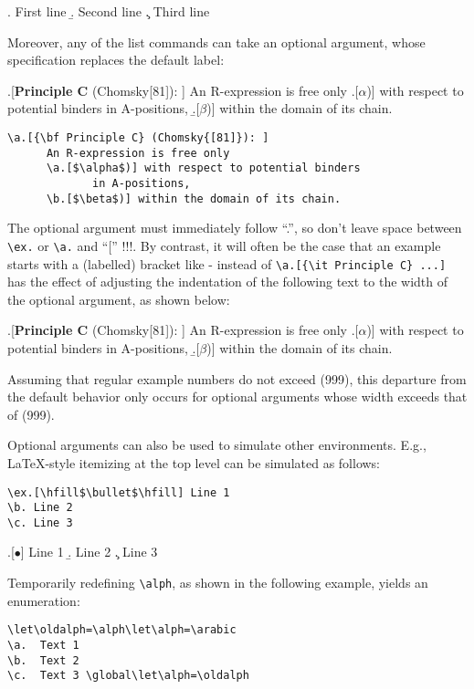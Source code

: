 \documentclass{article}
\begin{document}
\a. First line
\b. Second line
\c. Third line

Moreover, any of the list commands can take an optional 
argument, whose specification replaces the default label: 
 
\begin{samepage}
\a.[{\bf Principle C} (Chomsky{[81]}): ] An R-expression is free only
      \a.[$\alpha$)] with respect to potential binders
             in A-positions,
      \b.[$\beta$)] within the domain of its chain.
      
\begin{verbatim}
\a.[{\bf Principle C} (Chomsky{[81]}): ] 
      An R-expression is free only
      \a.[$\alpha$)] with respect to potential binders
             in A-positions,
      \b.[$\beta$)] within the domain of its chain.
 \end{verbatim}
\end{samepage}
%
The optional argument must immediately follow ``.'', so don't leave 
space between \verb|\ex.| or \verb|\a.| and ``['' !!!.  By contrast, 
it will often be the case that an example starts with a (labelled) 
bracket like \I[NP .  If so, it is obligatory to put a space 
between ``.'' and  ``['' .

As illustrated above, the topmost \verb#\a.#-command picks up the 
\verb|\Exlabelwidth| of the preceding example.  By contrast, using 
\verb-\ex.[{\it Principle C} ...]- instead of %
\verb-\a.[{\it Principle C} ...]- has the effect of adjusting the 
indentation of the following text to the width of the optional 
argument, as shown below:
  
\ex.[{\bf Principle C} (Chomsky{[81]}): ] An R-expression is free only
      \a.[$\alpha$)] with respect to potential binders
             in A-positions,
      \b.[$\beta$)] within the domain of its chain.
      
Assuming that regular example numbers do not exceed (999), this 
departure from the default behavior only occurs for optional arguments 
whose width exceeds that of (999).

Optional arguments can also be used to simulate other environments. 
E.g., \LaTeX-style itemizing at the top level can be simulated as follows:
\begin{verbatim}
\ex.[\hfill$\bullet$\hfill] Line 1
\b. Line 2
\c. Line 3
\end{verbatim}
\ex.[\hfill$\bullet$\hfill] Line 1
\b. Line 2
\c. Line 3\global\let\oldalph=\alph\global\let\alph=\arabic

Temporarily redefining \verb.\alph., as shown in the following 
example, yields an enumeration:
\begin{verbatim}
\let\oldalph=\alph\let\alph=\arabic
\a.  Text 1 
\b.  Text 2
\c.  Text 3 \global\let\alph=\oldalph
\end{verbatim}
\end{document}
